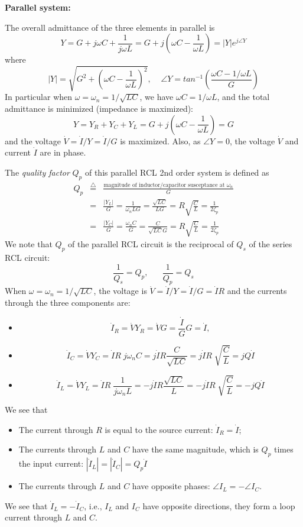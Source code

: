 {\bf Parallel system:} 


The overall admittance of the three elements in parallel is
\[ 
Y=G+j\omega C+\frac{1}{j\omega L}=G+j\left(\omega C-\frac{1}{\omega L}\right)
=|Y|e^{j\angle Y}	
\]
where
\[
|Y|=\sqrt{G^2+\left(\omega C-\frac{1}{\omega L}\right)^2},\;\;\;\;
\angle Y=tan^{-1} \left(\frac{\omega C-1/\omega L}{G}\right) 
\]
In particular when $\omega=\omega_n=1/\sqrt{LC}$, we have 
$\omega C=1/\omega L$, and the total admittance is minimized
(impedance is maximized):
\[ 
Y=Y_R+Y_C+Y_L=G+j\left(\omega C-\frac{1}{\omega L}\right)=G 
\]
and the voltage $\dot{V}=\dot{I}/Y=\dot{I}/G$ is maximized. Also, as 
$\angle Y=0$, the voltage $\dot{V}$ and current $\dot{I}$ are in phase.

The {\em quality factor} $Q_p$ of this parallel RCL 2nd order system is 
defined as
\begin{eqnarray}
  Q_p&\stackrel{\triangle}{=}&
  \frac{\mbox{magnitude of inductor/capacitor susceptance at $\omega_n$}}{G}
  \nonumber \\
  &=&\frac{|Y_L|}{G}=\frac{1}{\omega_nLG}=\frac{\sqrt{LC}}{LG}
  =R\sqrt{\frac{C}{L}}=\frac{1}{2\zeta_p}
  \nonumber \\
  &=&\frac{|Y_C|}{G}=\frac{\omega_n C}{G}=\frac{C}{\sqrt{LC}G}
  =R\sqrt{\frac{C}{L}}=\frac{1}{2\zeta_p}
  \nonumber
\end{eqnarray}
We note that $Q_p$ of the parallel RCL circuit is the reciprocal of $Q_s$ of
the series RCL circuit:
\[ 
\frac{1}{Q_s}=Q_p,\;\;\;\;\;\;\frac{1}{Q_p}=Q_s
\]
When $\omega=\omega_n=1/\sqrt{LC}$, the voltage is 
$\dot{V}=\dot{I}/Y=\dot{I}/G=\dot{I}R$
and the currents through the three components are:
\begin{itemize}
\item 
\[
\dot{I}_R=\dot{V}Y_R=\dot{V}G=\frac{\dot I}{G} G=\dot{I},
\]
\item 
\[
\dot{I}_C=\dot{V} Y_C=\dot{I}R\;j\omega_n C=j\dot{I}R\frac{C}{\sqrt{LC}}
=j \dot{I} R\;\sqrt{\frac{C}{L}}=jQ\dot{I}	
\]
\item 
\[
\dot{I}_L=\dot{V} Y_L=\dot{I}R\;\frac{1}{j\omega_n L}
=-j\dot{I}R\frac{\sqrt{LC}}{L}=-j \dot{I} R\;\sqrt{\frac{C}{L}}=-jQ\dot{I}	
\]
\end{itemize}
We see that 
\begin{itemize}
\item The current through $R$ is equal to the source current: 
  $\dot{I}_R=\dot{I}$;
\item The currents through $L$ and $C$ have the same magnitude, 
  which is $Q_p$ times the input current: 
  $|\dot{I}_L|=|\dot{I}_C|=Q_p\dot{I}$
\item The currents through $L$ and $C$ have opposite phases:
  $\angle I_L=-\angle I_C$. 
\end{itemize}
We see that $\dot{I}_L=-\dot{I}_C$, i.e., $I_L$ and $I_C$ have 
opposite directions, they form a loop current through $L$ and $C$.

